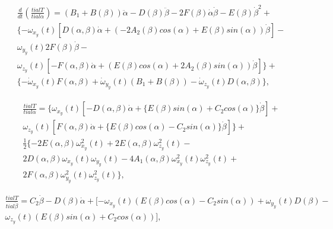 \begin{equation}%
\label{eq:p3:42+}
\begin{multlined}
\frac{d}{d t}\left( \frac{ tial T}{ tial \dot \alpha}\right) = 
(B_1 + B(\beta)) \ddot{\alpha} - 
D(\beta) \ddot{\beta} - 
2F(\beta)\dot{\alpha}\dot{\beta} - 
E(\beta)\dot{\beta}^2 
+
\\
\{ 
	-\omega_{x_y} (t) \left[ D(\alpha, \beta)\dot{\alpha} + (-2A_2(\beta)cos(\alpha)+E(\beta)sin(\alpha))\dot{\beta} \right] -\\
	\omega_{y_y} (t) 2F(\beta)\dot{\beta}-\\
	\omega_{z_y} (t) 
	\left[ 
		-F(\alpha, \beta)\dot{\alpha} + 
		(
			E(\beta)cos(\alpha) + 
			2A_2(\beta)sin(\alpha)
		) 
		\dot{\beta} 
	\right]
\}
+\\
\{
	-\dot{\omega}_{x_y} (t) F(\alpha, \beta)
	+\dot{\omega}_{y_y} (t) (B_1 + B(\beta))
	-\dot{\omega}_{z_y} (t) D(\alpha, \beta)
\}
,
\end{multlined}
\end{equation}


\begin{equation}%
\label{eq:p3:43}
\begin{multlined}
\frac{ tial T}{ tial \alpha}=
\{
	\omega_{x_y} (t) 
	\left[ 
		-D(\alpha, \beta)\dot{\alpha}
		+
		\{
			E(\beta) sin(\alpha) +
			C_2 cos(\alpha)
		\} \dot{\beta}
	\right] +\\
	\omega_{z_y} (t)
	\left[ 
		F(\alpha, \beta)\dot{\alpha}
		+
		\{
		E(\beta) cos(\alpha) -
		C_2 sin(\alpha)
		\} \dot{\beta}
	\right] 
\}
 +\\
\frac{1}{2}
\{
 	-2E(\alpha, \beta)\omega^2_{x_y}(t) +
 	2E(\alpha, \beta)\omega^2_{z_y}(t)-\\
 	2D(\alpha, \beta)\omega_{x_y} (t) \omega_{y_y} (t)-
 	4A_1(\alpha, \beta)\omega^2_{x_y}(t) \omega^2_{z_y}(t) +\\
 	2F(\alpha, \beta)\omega^2_{y_y}(t) \omega^2_{z_y}(t)
\} 
,
\end{multlined}
\end{equation}


\begin{equation}%
\label{eq:p3:44}
\begin{multlined}
\frac{ tial T}{ tial \dot \beta}= 
C_2 \dot{\beta} - D(\beta)\dot{\alpha} + 
[ 
	-\omega_{x_y} (t) (E(\beta)cos(\alpha) - C_2 sin(\alpha))
	+\omega_{y_y} (t) D(\beta) - \\
	\omega_{z_y} (t) (E(\beta)sin(\alpha) + C_2 cos(\alpha))
],
\end{multlined}
\end{equation}

